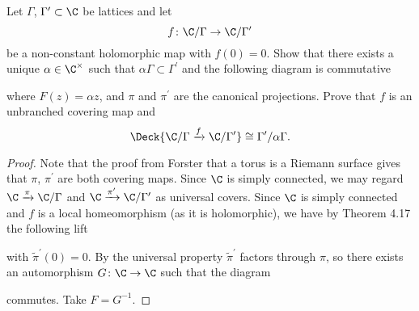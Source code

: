 \documentclass[10pt]{amsart}
\begin{document}
\begin{thm}
  Let $\Gamma$, $\Gamma^\prime \subset \C$ be lattices and let
  $$f \colon \C / \Gamma \rightarrow \C / \Gamma^\prime$$
  be a non-constant holomorphic map with $f(0) = 0$.
  Show that there exists a unique $\alpha \in \C^\times$ such that $\alpha\Gamma \subset \Gamma^\prime$ and the following diagram is commutative
  \begin{center}
  \end{center}
  where $F(z) = \alpha z$, and $\pi$ and $\pi^\prime$ are the canonical projections.
  Prove that $f$ is an unbranched covering map and
  $$\Deck{\C/\Gamma \xrightarrow{f} \C/\Gamma^\prime} \cong \Gamma^\prime / \alpha\Gamma.$$

  \begin{proof}
    Note that the proof from Forster that a torus is a Riemann surface gives that $\pi$, $\pi^\prime$ are both covering maps.
    Since $\C$ is simply connected, we may regard $\C \xrightarrow{\pi} \C/\Gamma$ and $\C \xrightarrow{\pi^\prime} \C/\Gamma^\prime$ as universal covers.
    Since $\C$ is simply connected and $f$ is a local homeomorphism (as it is holomorphic), we have by Theorem 4.17 the following lift
    \begin{center}
    \end{center}
    with $\tilde{\pi}^\prime(0) = 0$.
    By the universal property $\tilde{\pi}^\prime$ factors through $\pi$, so there exists an automorphism $G \colon \C \rightarrow \C$ such that the diagram
    \begin{center}
    \end{center}
    commutes.
    Take $F = G^{-1}$.

  \end{proof}
\end{thm}
\end{document}
